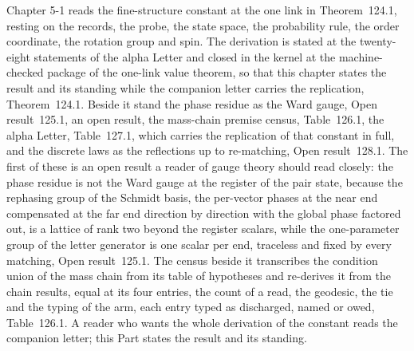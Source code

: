 Chapter 5-1 reads the fine-structure constant at the one link in Theorem~124.1, resting on the records, the probe, the state space, the probability rule, the order coordinate, the rotation group and spin. The derivation is stated at the twenty-eight statements of the alpha Letter and closed in the kernel at the machine-checked package of the one-link value theorem, so that this chapter states the result and its standing while the companion letter carries the replication, Theorem~124.1. Beside it stand the phase residue as the Ward gauge, Open result~125.1, an open result, the mass-chain premise census, Table~126.1, the alpha Letter, Table~127.1, which carries the replication of that constant in full, and the discrete laws as the reflections up to re-matching, Open result~128.1. The first of these is an open result a reader of gauge theory should read closely: the phase residue is not the Ward gauge at the register of the pair state, because the rephasing group of the Schmidt basis, the per-vector phases at the near end compensated at the far end direction by direction with the global phase factored out, is a lattice of rank two beyond the register scalars, while the one-parameter group of the letter generator is one scalar per end, traceless and fixed by every matching, Open result~125.1. The census beside it transcribes the condition union of the mass chain from its table of hypotheses and re-derives it from the chain results, equal at its four entries, the count of a read, the geodesic, the tie and the typing of the arm, each entry typed as discharged, named or owed, Table~126.1. A reader who wants the whole derivation of the constant reads the companion letter; this Part states the result and its standing.

